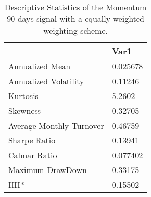 \begin{table}[H]
\centering
\begin{tabular}{ll}
& Var1 \\ 
\hline 
Annualized Mean & 0.025678 \\ 
Annualized Volatility & 0.11246 \\ 
Kurtosis & 5.2602 \\ 
Skewness & 0.32705 \\ 
Average Monthly Turnover & 0.46759 \\ 
Sharpe Ratio & 0.13941 \\ 
Calmar Ratio & 0.077402 \\ 
Maximum DrawDown & 0.33175 \\ 
HH* & 0.15502 \\ 
\hline
\end{tabular}
\caption{Descriptive Statistics of the Momentum 90 days signal with a equally weighted weighting scheme.}
\label{MOM90EW}
\end{table}
